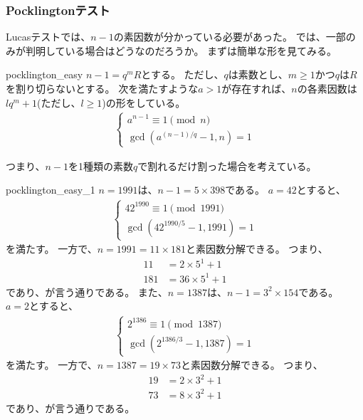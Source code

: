 \subsubsection{Pocklingtonテスト}
Lucasテストでは、$n-1$の素因数が分かっている必要があった。
では、一部のみが判明している場合はどうなのだろうか。
まずは簡単な形を見てみる。

\begin{Theo}{}{pocklington_easy}
$n-1=q^mR$とする。
ただし、$q$は素数とし、$m\ge1$かつ$q$は$R$を割り切らないとする。
次を満たすような$a>1$が存在すれば、$n$の各素因数は$lq^m+1$(ただし、$l\ge1$)の形をしている。
\begin{align*}
\begin{cases}
a^{n-1} \equiv 1 \pmod{n}\\
\gcd(a^{(n-1)/q}-1, n) = 1
\end{cases}
\end{align*}
\end{Theo}

つまり、$n-1$を1種類の素数$q$で割れるだけ割った場合を考えている。

\begin{Exam}{}{pocklington_easy_1}
$n = 1991$は、$n-1=5\times398$である。
$a=42$とすると、
\begin{align*}
\begin{cases}
42^{1990} \equiv 1 \pmod{1991}\\
\gcd(42^{1990 / 5} - 1, 1991) = 1
\end{cases}
\end{align*}
を満たす。
一方で、$n=1991=11\times181$と素因数分解できる。
つまり、
\begin{align*}
11 &= 2 \times 5^1 + 1\\
181 &= 36 \times 5^1 + 1
\end{align*}
であり、が言う通りである。
また、$n = 1387$は、$n-1=3^2\times154$である。
$a=2$とすると、
\begin{align*}
\begin{cases}
2^{1386} \equiv 1 \pmod{1387}\\
\gcd(2^{1386 / 3} - 1, 1387) = 1
\end{cases}
\end{align*}
を満たす。
一方で、$n=1387=19\times73$と素因数分解できる。
つまり、
\begin{align*}
19 &= 2 \times 3^2 + 1\\
73 &= 8 \times 3^2 + 1
\end{align*}
であり、が言う通りである。
\end{Exam}

